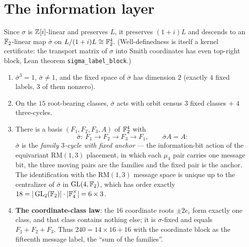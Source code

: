 \section{The information layer}\label{sec:info}

Since $\sigma$ is $\mathbb Z[i]$-linear and preserves $L$, it preserves
$(1+i)L$ and descends to an $\mathbb F_2$-linear map $\bar\sigma$ on
$L/(1+i)L\cong\mathbb F_2^4$.  (Well-definedness is itself a kernel
certificate: the transport matrix of $\sigma$ into Smith coordinates
has even top-right block, Lean theorem \texttt{sigma\_label\_block}.)

\begin{theorem}\label{thm:info}
\begin{enumerate}
\item[(i)] $\bar\sigma^3=1$, $\bar\sigma\neq1$, and the fixed space
of $\bar\sigma$ has dimension $2$ (exactly $4$ fixed labels, $3$ of
them nonzero).
\item[(ii)] On the $15$ root-bearing classes, $\bar\sigma$ acts with
orbit census $3$ fixed classes $+$ $4$ three-cycles.
\item[(iii)] There is a basis $(F_1,F_2,F_3,A)$ of $\mathbb F_2^4$ with
\[
\bar\sigma:\ F_1\to F_2\to F_3\to F_1,\qquad \bar\sigma A=A :
\]
$\bar\sigma$ is the \emph{family $3$-cycle with fixed anchor} --- the
information-bit action of the equivariant $\mathrm{RM}(1,3)$
placement, in which each $\mu_4$ pair carries one message bit, the
three moving pairs are the families and the fixed pair is the anchor.
The identification with the $\mathrm{RM}(1,3)$ message space is
unique up to the centralizer of $\bar\sigma$ in $\operatorname{GL}(4,\mathbb F_2)$, which
has order exactly $18=|\operatorname{GL}_2(\mathbb F_2)|\cdot|\mathbb F_4^\times|=6\times3$.
\item[(iv)] \textbf{The coordinate-class law}: the $16$ coordinate
roots $\pm2e_i$ form exactly one class, and that class contains
nothing else; it is $\sigma$-fixed and equals $F_1+F_2+F_3$.  Thus
$240=14\times16+16$ with the coordinate block as the fifteenth
message label, the ``sum of the families''.
\end{enumerate}
\end{theorem}

